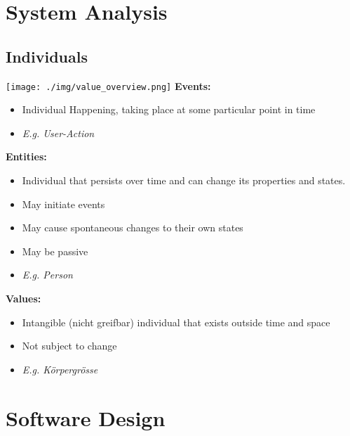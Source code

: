 
\section{System Analysis}
\subsection{Individuals}
\texttt{[image: ./img/value\_overview.png]}
\textbf{Events:}
\begin{itemize}
    \item Individual Happening, taking place at some particular point in time
    \item \textit{E.g. User-Action}
\end{itemize}
\textbf{Entities:}
\begin{itemize}
    \item Individual that persists over time and can change its properties and states.
    \item May initiate events
    \item May cause spontaneous changes to their own states
    \item May be passive
    \item \textit{E.g. Person}
\end{itemize}
\textbf{Values:}
\begin{itemize}
    \item Intangible (nicht greifbar) individual that exists outside time and space
    \item Not subject to change
    \item \textit{E.g. Körpergrösse}
\end{itemize}

\section{Software Design}
